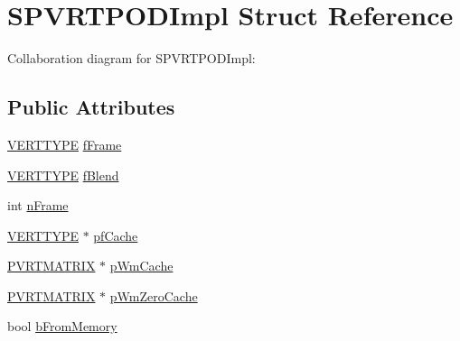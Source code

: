 \hypertarget{struct_s_p_v_r_t_p_o_d_impl}{\section{S\+P\+V\+R\+T\+P\+O\+D\+Impl Struct Reference}
\label{struct_s_p_v_r_t_p_o_d_impl}
}


Collaboration diagram for S\+P\+V\+R\+T\+P\+O\+D\+Impl\+:
\subsection*{Public Attributes}
\begin{DoxyCompactItemize}
\item 
\hyperlink{group___a_p_i___o_g_l_e_s_ga06da457b7d3e93368ab904f89e1396be}{V\+E\+R\+T\+T\+Y\+P\+E} \hyperlink{struct_s_p_v_r_t_p_o_d_impl_a48b1c6f0eb7c1611b698f3509179e8d1}{f\+Frame}
\item 
\hyperlink{group___a_p_i___o_g_l_e_s_ga06da457b7d3e93368ab904f89e1396be}{V\+E\+R\+T\+T\+Y\+P\+E} \hyperlink{struct_s_p_v_r_t_p_o_d_impl_aed4ac6d8a9fd291fb76de79c96d7de25}{f\+Blend}
\item 
int \hyperlink{struct_s_p_v_r_t_p_o_d_impl_a7a037b06b36243a80519a0f2dd0dfd48}{n\+Frame}
\item 
\hyperlink{group___a_p_i___o_g_l_e_s_ga06da457b7d3e93368ab904f89e1396be}{V\+E\+R\+T\+T\+Y\+P\+E} $\ast$ \hyperlink{struct_s_p_v_r_t_p_o_d_impl_a3c69f6f366782ca066e8ba02947773f2}{pf\+Cache}
\item 
\hyperlink{class_p_v_r_t_m_a_t_r_i_xf}{P\+V\+R\+T\+M\+A\+T\+R\+I\+X} $\ast$ \hyperlink{struct_s_p_v_r_t_p_o_d_impl_a0b83155ef715552a9be8edf633e080e4}{p\+Wm\+Cache}
\item 
\hyperlink{class_p_v_r_t_m_a_t_r_i_xf}{P\+V\+R\+T\+M\+A\+T\+R\+I\+X} $\ast$ \hyperlink{struct_s_p_v_r_t_p_o_d_impl_ac80e0c3a4d472863088172e90746f0f5}{p\+Wm\+Zero\+Cache}
\item 
bool \hyperlink{struct_s_p_v_r_t_p_o_d_impl_af7ca0be82a1ef1d0ea06b80f03194f84}{b\+From\+Memory}
\end{DoxyCompactItemize}


